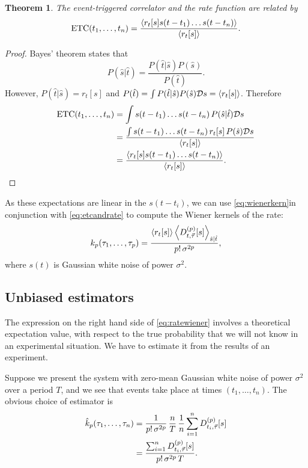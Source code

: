 \documentclass[12pt]{article}
\theoremstyle{slplain}
\newtheorem{thm}{Theorem}
\theoremstyle{sldefinition}
\theoremstyle{remark}
\DeclareMathOperator{\ETC}{ETC}
\begin{document}
\begin{thm}
  The event-triggered correlator and the rate function are related by
  \begin{equation}\label{eq:etcandrate}
    \ETC(t_1,\ldots,t_n) = \frac{\av{r_t[s]s(t-t_1)\ldots s(t-t_n)}}{\av{r_t[s]}}.
  \end{equation}
\end{thm}
\begin{proof}
  Bayes' theorem states that
  \begin{equation}\label{eq:bayes}
    P(\hat{s}|\hat{t}) = \frac{P(\hat{t}|\hat{s})P(\hat{s})}{P(\hat{t})}.
  \end{equation}
  However, $P(\hat{t}|\hat{s})=r_t[s]$ and $P(\hat{t})=\int P(\hat{t}|\hat{s})P(\hat{s})\mathcal{D} s = \left\langle r_t[s] \right\rangle$. Therefore
  \begin{equation}\label{eq:pfetcandrate}
    \begin{aligned}
      \ETC(t_1,\ldots,t_n) &= \int s(t-t_1)\ldots s(t-t_n) \, P(\hat{s}|\hat{t})\CD s\\
        &= \frac{\int s(t-t_1)\ldots s(t-t_n) \, r_t[s]\,P(\hat{s})\CD s }{ \av{r_t[s]} }\\
        &= \frac{\av{r_t[s]s(t-t_1)\ldots s(t-t_n)}}{\av{r_t[s]}}.
    \end{aligned}
  \end{equation}
\end{proof}

As these expectations are linear in the $s(t-t_i)$, we can use \eqref{eq:wienerkern}in conjunction with \eqref{eq:etcandrate} to compute the Wiener kernels of the rate:
%
\begin{equation}\label{eq:ratewiener}
  k_p(\tau_1,\ldots,\tau_p) = \frac{ \left\langle r_t[s] \right\rangle \left\langle D^{(p)}_{t,\vec{\tau}}[s] \right\rangle_{\hat{s}|\hat{t}} }{ p! \, \sigma^{2p} },
\end{equation}
%
where $s(t)$ is Gaussian white noise of power $\sigma^2$.

\subsection{Unbiased estimators}\label{sec:poissonest}

The expression on the right hand side of \eqref{eq:ratewiener} involves a theoretical expectation value, with respect to the true probability that we will not know in an experimental situation. We have to estimate it from the results of an experiment.

Suppose we present the system with zero-mean Gaussian white noise of power $\sigma^2$ over a period $T$, and we see that events take place at times $(t_1,\ldots,t_n)$. The obvious choice of estimator is
%
\begin{equation}\label{eq:ratewienerest}
  \begin{aligned}
    \hat{k}_p(\tau_1,\ldots,\tau_n) &= \frac{1}{p!\,\sigma^{2p}} \, \frac{n}{T} \, \frac{1}{n} \sum_{i=1}^n D^{(p)}_{t_i,\vec{\tau}}[s] \\
      &= \frac{ \sum_{i=1}^n D^{(p)}_{t_i,\vec{\tau}}[s]}{p!\,\sigma^{2p}\,T}.
  \end{aligned}
\end{equation}
%
\end{document}
